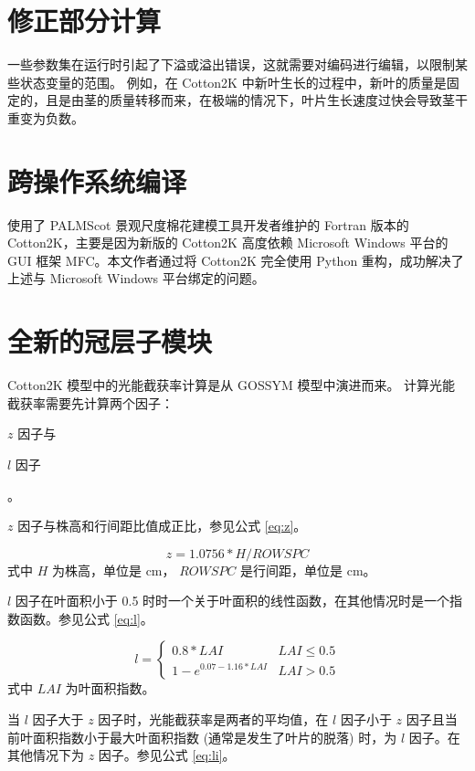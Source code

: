 \section{修正部分计算}
一些参数集在运行时引起了下溢或溢出错误，这就需要对编码进行编辑，以限制某些状态变量的范围。
例如，在 Cotton2K 中新叶生长的过程中，新叶的质量是固定的，且是由茎的质量转移而来，在极端的情况下，叶片生长速度过快会导致茎干重变为负数。

\section{跨操作系统编译}
 使用了 PALMScot 景观尺度棉花建模工具开发者维护的 Fortran 版本的 Cotton2K，主要是因为新版的 Cotton2K 高度依赖%
Microsoft Windows 平台的 GUI 框架 MFC。本文作者通过将 Cotton2K 完全使用 Python 重构，成功解决了上述与 Microsoft Windows 平台绑定的问题。

\section{全新的冠层子模块}\label{sec:canopyLayering}
Cotton2K 模型中的光能截获率计算是从 GOSSYM 模型中演进而来。
计算光能截获率需要先计算两个因子：\begin{enumerate*}
    \item $z$ 因子与
    \item $l$ 因子
\end{enumerate*}。

$z$ 因子与株高和行间距比值成正比，参见公式 \ref{eq:z}。

\begin{equation}\label{eq:z}
    z = 1.0756 * H / ROWSPC
\end{equation}
式中 $H$ 为株高，单位是 cm， $ROWSPC$ 是行间距，单位是 cm。

$l$ 因子在叶面积小于 0.5 时时一个关于叶面积的线性函数，在其他情况时是一个指数函数。参见公式 \ref{eq:l}。

\begin{equation}\label{eq:l}
    l = \begin{cases}
        0.8 * LAI                 & LAI \le 0.5 \\
        1 - e^{0.07 - 1.16 * LAI} & LAI > 0.5
    \end{cases}
\end{equation}
式中 $LAI$ 为叶面积指数。

当 $l$ 因子大于 $z$ 因子时，光能截获率是两者的平均值，在 $l$ 因子小于 $z$ 因子且当前叶面积指数小于最大叶面积指数
(通常是发生了叶片的脱落) 时，为 $l$ 因子。在其他情况下为 $z$ 因子。参见公式 \ref{eq:li}。

